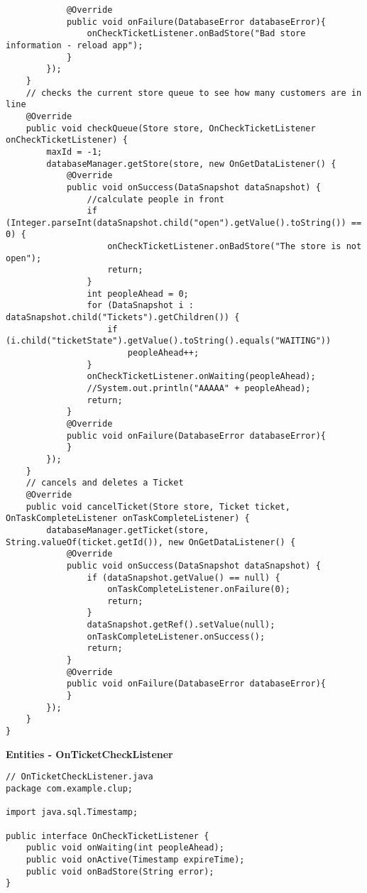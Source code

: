 \begin{lstlisting}
            @Override
            public void onFailure(DatabaseError databaseError){
                onCheckTicketListener.onBadStore("Bad store information - reload app");
            }
        });
    }
    // checks the current store queue to see how many customers are in line
    @Override
    public void checkQueue(Store store, OnCheckTicketListener onCheckTicketListener) {
        maxId = -1;
        databaseManager.getStore(store, new OnGetDataListener() {
            @Override
            public void onSuccess(DataSnapshot dataSnapshot) {
                //calculate people in front
                if (Integer.parseInt(dataSnapshot.child("open").getValue().toString()) == 0) {
                    onCheckTicketListener.onBadStore("The store is not open");
                    return;
                }
                int peopleAhead = 0;
                for (DataSnapshot i : dataSnapshot.child("Tickets").getChildren()) {
                    if (i.child("ticketState").getValue().toString().equals("WAITING"))
                        peopleAhead++;
                }
                onCheckTicketListener.onWaiting(peopleAhead);
                //System.out.println("AAAAA" + peopleAhead);
                return;
            }
            @Override
            public void onFailure(DatabaseError databaseError){
            }
        });
    }
    // cancels and deletes a Ticket
    @Override
    public void cancelTicket(Store store, Ticket ticket, OnTaskCompleteListener onTaskCompleteListener) {
        databaseManager.getTicket(store, String.valueOf(ticket.getId()), new OnGetDataListener() {
            @Override
            public void onSuccess(DataSnapshot dataSnapshot) {
                if (dataSnapshot.getValue() == null) {
                    onTaskCompleteListener.onFailure(0);
                    return;
                }
                dataSnapshot.getRef().setValue(null);
                onTaskCompleteListener.onSuccess();
                return;
            }
            @Override
            public void onFailure(DatabaseError databaseError){
            }
        });
    }
}

\end{lstlisting}

\textbf{Entities - OnTicketCheckListener}

\begin{lstlisting}
// OnTicketCheckListener.java
package com.example.clup;

import java.sql.Timestamp;

public interface OnCheckTicketListener {
    public void onWaiting(int peopleAhead);
    public void onActive(Timestamp expireTime);
    public void onBadStore(String error);
}

\end{lstlisting}

